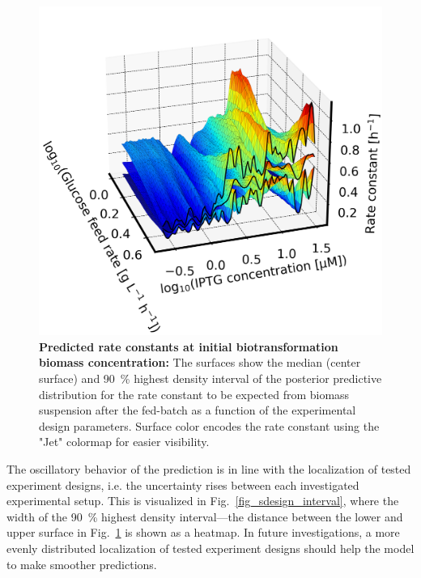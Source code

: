 \documentclass[sn-standardnature]{sn-jnl}%
\theoremstyle{thmstyleone}%
\theoremstyle{thmstyletwo}%
\theoremstyle{thmstylethree}%
\begin{document}
\begin{figure}[H]
    \centering
    \includegraphics[width=1.0\textwidth]{figures/Fig11.png}
    \caption{
        \textbf{Predicted rate constants at initial biotransformation biomass concentration:}
        The surfaces show the median (center surface) and 90~\% highest density interval of the posterior predictive distribution for the rate constant to be expected from biomass suspension after the fed-batch as a function of the experimental design parameters.
        Surface color encodes the rate constant using the "Jet" colormap \cite{matplotlibDocs} for easier visibility.
    }
    \label{fig_3Dkdesign}
\end{figure}

The oscillatory behavior of the prediction is in line with the localization of tested experiment designs, i.e. the uncertainty rises between each investigated experimental setup.
This is visualized in Fig.~\ref{fig_sdesign_interval}, where the width of the 90~\% highest density interval---the distance between the lower and upper surface in Fig.~\ref{fig_3Dkdesign} is shown as a heatmap.
In future investigations, a more evenly distributed localization of tested experiment designs should help the model to make smoother predictions.
\end{document}
